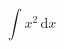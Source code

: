 \documentclass[border=2pt,varwidth=true]{standalone}
\begin{document}
\begin{displaymath}
\int x^2 \, \mathrm{d}x 
\end{displaymath}
\end{document}
